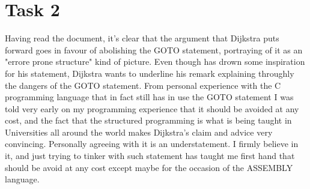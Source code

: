 \chapter{Task 2}
Having read the document, it's clear that the argument that Dijkstra puts forward goes in favour of abolishing the GOTO statement, portraying of it as an "errore prone structure" kind of picture. Even though has drown some inspiration for his statement, Dijkstra wants to underline his remark explaining throughly the dangers of the GOTO statement. 
From personal experience with the C programming language that in fact still has in use the GOTO statement I was told very early on my programming experience that it should be avoided at any cost, and the fact that the structured programming is what is being taught in Universities all around the world makes Dijkstra's claim and advice very convincing. Personally agreeing with it is an understatement. I firmly believe in it, and just trying to tinker with such statement has taught me first hand that should be avoid at any cost except maybe for the occasion of the ASSEMBLY language.